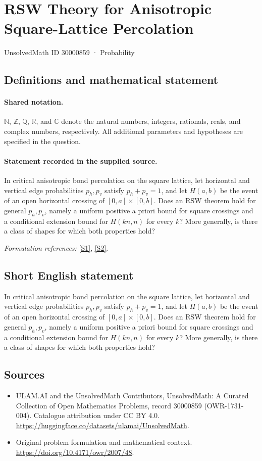\documentclass[11pt]{article}
\newcommand{\sref}[2]{\hyperlink{source:#1:#2}{[S#2]}}
\begin{document}
\setcounter{section}{30000858}
\section{RSW Theory for Anisotropic Square-Lattice Percolation}\label{30000859}
{\small UnsolvedMath ID 30000859 · Probability}
\subsection{Definitions and mathematical statement}

\paragraph{Shared notation.}$\mathbb N$, $\mathbb Z$, $\mathbb Q$, $\mathbb R$, and $\mathbb C$ denote the natural numbers, integers, rationals, reals, and complex numbers, respectively. All additional parameters and hypotheses are specified in the question.


\paragraph{Statement recorded in the supplied source.}
In critical anisotropic bond percolation on the square lattice, let horizontal and vertical edge probabilities $p_h,p_v$ satisfy $p_h+p_v=1$, and let $H(a,b)$ be the event of an open horizontal crossing of $[0,a]\times[0,b]$. Does an RSW theorem hold for general $p_h,p_v$, namely a uniform positive a priori bound for square crossings and a conditional extension bound for $H(kn,n)$ for every $k$? More generally, is there a class of shapes for which both properties hold?
\par\smallskip\textit{Formulation references:} \sref{30000859}{1}, \sref{30000859}{2}.
\subsection{Short English statement}
In critical anisotropic bond percolation on the square lattice, let horizontal and vertical edge probabilities $p_h,p_v$ satisfy $p_h+p_v=1$, and let $H(a,b)$ be the event of an open horizontal crossing of $[0,a]\times[0,b]$. Does an RSW theorem hold for general $p_h,p_v$, namely a uniform positive a priori bound for square crossings and a conditional extension bound for $H(kn,n)$ for every $k$? More generally, is there a class of shapes for which both properties hold?
\subsection{Sources}
\begin{itemize}
\item[\hypertarget{source:30000859:1}{S1}] ULAM.AI and the UnsolvedMath Contributors, UnsolvedMath: A Curated Collection of Open Mathematics Problems, record 30000859 (OWR-1731-004). Catalogue attribution under CC BY 4.0.
\url{https://huggingface.co/datasets/ulamai/UnsolvedMath}.
\item[\hypertarget{source:30000859:2}{S2}] Original problem formulation and mathematical context.
\url{https://doi.org/10.4171/owr/2007/48}.
\end{itemize}
\label{end:30000859}
\end{document}
